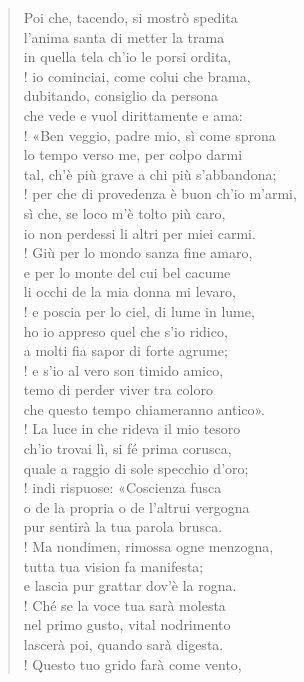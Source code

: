 \documentclass[a4paper, twoside, titlepage]{book}
\newcounter{mar}
\begin{document}
\begin{verse}
Poi che, tacendo, si mostrò spedita\\
l’anima santa di metter la trama\\
in quella tela ch’io le porsi ordita,\\!
io cominciai, come colui che brama,\\
dubitando, consiglio da persona\\
che vede e vuol dirittamente e ama:\\!
«Ben veggio, padre mio, sì come sprona\\
lo tempo verso me, per colpo darmi\\
tal, ch’è più grave a chi più s’abbandona;\\!
per che di provedenza è buon ch’io m’armi,\\
sì che, se loco m’è tolto più caro,\\
io non perdessi li altri per miei carmi.\\!
Giù per lo mondo sanza fine amaro,\\
e per lo monte del cui bel cacume\\
li occhi de la mia donna mi levaro,\\!
e poscia per lo ciel, di lume in lume,\\
ho io appreso quel che s’io ridico,\\
a molti fia sapor di forte agrume;\\!
e s’io al vero son timido amico,\\
temo di perder viver tra coloro\\
che questo tempo chiameranno antico».\\!
La luce in che rideva il mio tesoro\\
ch’io trovai lì, si fé prima corusca,\\
quale a raggio di sole specchio d’oro;\\!
indi rispuose: «Coscienza fusca\\
o de la propria o de l’altrui vergogna\\
pur sentirà la tua parola brusca.\\!
Ma nondimen, rimossa ogne menzogna,\\
tutta tua vision fa manifesta;\\
e lascia pur grattar dov’è la rogna.\\!
Ché se la voce tua sarà molesta\\
nel primo gusto, vital nodrimento\\
lascerà poi, quando sarà digesta.\\!
Questo tuo grido farà come vento,\\

\end{verse}
\end{document}
